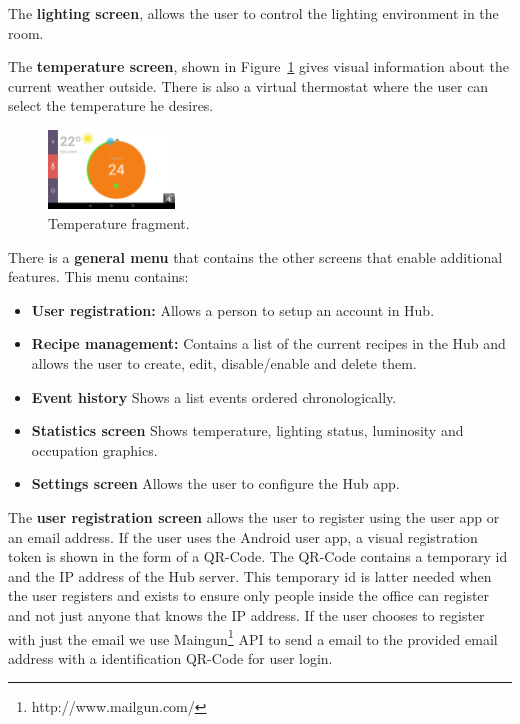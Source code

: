 \documentclass[conference]{IEEEtran}
\begin{document}
The \textbf{lighting screen}, allows the user to control the lighting environment in the room.

The \textbf{temperature screen}, shown in Figure~\ref{screen_temperature} gives visual information about the current weather outside. There is also a virtual thermostat where the user can select the temperature he desires. 


\begin{figure}[h]
\centering
\includegraphics[width=0.3\textwidth]{Figures/screen_temperature}
\caption{Temperature fragment.}
\label{screen_temperature}
\end{figure}


There is a \textbf{general menu} that contains the other screens that enable additional features. This menu contains:
\begin{itemize}
  \item \textbf{User registration:} Allows a person to setup an account in Hub.
  \item \textbf{Recipe management:} Contains a list of the current recipes in the Hub and allows the user to create, edit, disable/enable and delete them.
  
  \item \textbf{Event history} Shows a list events ordered chronologically.
  
  \item \textbf{Statistics screen} Shows temperature, lighting status, luminosity and occupation graphics.   
  
  \item \textbf{Settings screen} Allows the user to configure the Hub app.
\end{itemize}



The \textbf{user registration screen} allows the user to register using the user app or an email address.
If the user uses the Android user app, a visual registration token is shown in the form of a QR-Code. The QR-Code contains a temporary id and the IP address of the Hub server. This temporary id is latter needed when the user registers and exists to ensure only people inside the office can register and not just anyone that knows the IP address. If the user chooses to register with just the email we use Maingun\footnote{http://www.mailgun.com/} API to send a email to the provided email address with a identification QR-Code for user login.
\end{document}
